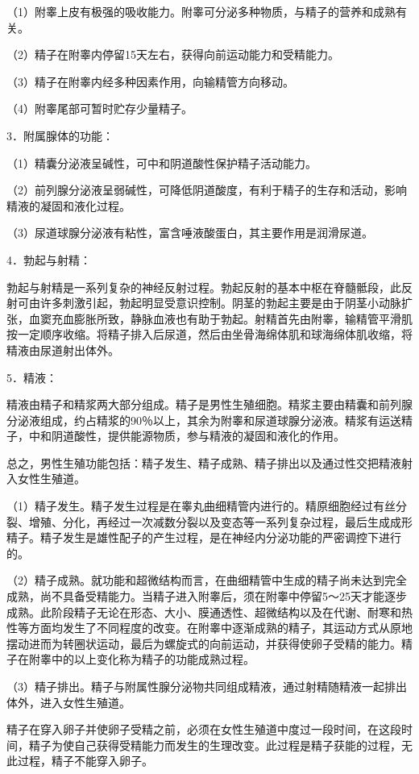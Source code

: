 \documentclass[12pt,UTF8]{ctexbook}
\begin{document}
（1）附睾上皮有极强的吸收能力。附睾可分泌多种物质，与精子的营养和成熟有关。

（2）精子在附睾内停留15天左右，获得向前运动能力和受精能力。

（3）精子在附睾内经多种因素作用，向输精管方向移动。

（4）附睾尾部可暂时贮存少量精子。

3．附属腺体的功能：

（1）精囊分泌液呈碱性，可中和阴道酸性保护精子活动能力。

（2）前列腺分泌液呈弱碱性，可降低阴道酸度，有利于精子的生存和活动，影响精液的凝固和液化过程。

（3）尿道球腺分泌液有粘性，富含唾液酸蛋白，其主要作用是润滑尿道。

4．勃起与射精：

勃起与射精是一系列复杂的神经反射过程。勃起反射的基本中枢在脊髓骶段，此反射可由许多刺激引起，勃起明显受意识控制。阴茎的勃起主要是由于阴茎小动脉扩张，血窦充血膨胀所致，静脉血液也有助于勃起。射精首先由附睾，输精管平滑肌按一定顺序收缩。将精子排入后尿道，然后由坐骨海绵体肌和球海绵体肌收缩，将精液由尿道射出体外。

5．精液：

精液由精子和精浆两大部分组成。精子是男性生殖细胞。精浆主要由精囊和前列腺分泌液组成，约占精浆的90％以上，其余为附睾和尿道球腺分泌液。精浆有运送精子，中和阴道酸性，提供能源物质，参与精液的凝固和液化的作用。

总之，男性生殖功能包括：精子发生、精子成熟、精子排出以及通过性交把精液射入女性生殖道。

（1）精子发生。精子发生过程是在睾丸曲细精管内进行的。精原细胞经过有丝分裂、增殖、分化，再经过一次减数分裂以及变态等一系列复杂过程，最后生成成形精子。精子发生是雄性配子的产生过程，是在神经内分泌功能的严密调控下进行的。

（2）精子成熟。就功能和超微结构而言，在曲细精管中生成的精子尚未达到完全成熟，尚不具备受精能力。当精子进入附睾后，须在附睾中停留5～25天才能逐步成熟。此阶段精子无论在形态、大小、膜通透性、超微结构以及在代谢、耐寒和热性等方面均发生了不同程度的改变。在附睾中逐渐成熟的精子，其运动方式从原地摆动进而为转圈状运动，最后为螺旋式的向前运动，并获得使卵子受精的能力。精子在附睾中的以上变化称为精子的功能成熟过程。

（3）精子排出。精子与附属性腺分泌物共同组成精液，通过射精随精液一起排出体外，进入女性生殖道。

精子在穿入卵子并使卵子受精之前，必须在女性生殖道中度过一段时间，在这段时间，精子为使自己获得受精能力而发生的生理改变。此过程是精子获能的过程，无此过程，精子不能穿入卵子。
\end{document}
